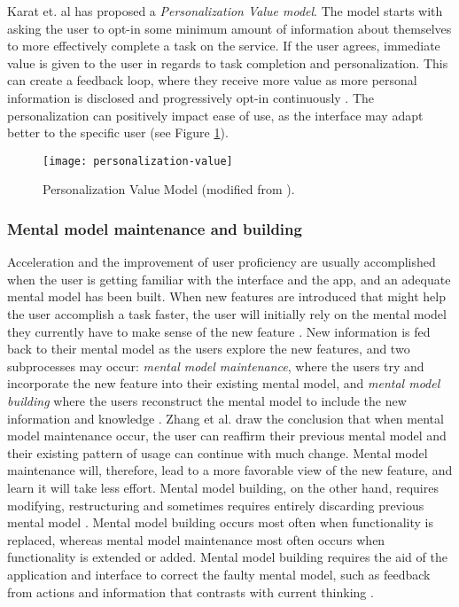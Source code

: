 Karat et. al has proposed a \textit{Personalization Value model}. The model starts with asking the user to opt-in some minimum amount of information about themselves to more effectively complete a task on the service. If the user agrees, immediate value is given to the user in regards to task completion and personalization. This can create a feedback loop, where they receive more value as more personal information is disclosed and progressively opt-in continuously \cite{Karat2003}. The personalization can positively impact ease of use, as the interface may adapt better to the specific user (see Figure \ref{fig:personalization-value}).

\begin{figure}[h]
  \centering
    \texttt{[image: personalization-value]}
  \caption{Personalization Value Model (modified from \cite{Karat2003}).}
  \label{fig:personalization-value}
\end{figure}

\subsubsection{Mental model maintenance and building}
Acceleration and the improvement of user proficiency are usually accomplished when the user is getting familiar with the interface and the app, and an adequate mental model has been built. When new features are introduced that might help the user accomplish a task faster, the user will initially rely on the mental model they currently have to make sense of the new feature \cite{Orlikowski2000}. New information is fed back to their mental model as the users explore the new features, and two subprocesses may occur: \textit{mental model maintenance}, where the users try and incorporate the new feature into their existing mental model, and \textit{mental model building} where the users reconstruct the mental model to include the new information and knowledge \cite{Vandenbosch1996}. Zhang et al. \cite{Zhang2011} draw the conclusion that when mental model maintenance occur, the user can reaffirm their previous mental model and their existing pattern of usage can continue with much change. Mental model maintenance will, therefore, lead to a more favorable view of the new feature, and learn it will take less effort. Mental model building, on the other hand, requires modifying, restructuring and sometimes requires entirely discarding previous mental model \cite{Vandenbosch1996}. Mental model building occurs most often when functionality is replaced, whereas mental model maintenance most often occurs when functionality is extended or added. Mental model building requires the aid of the application and interface to correct the faulty mental model, such as feedback from actions and information that contrasts with current thinking \cite{Hsu2011}.

